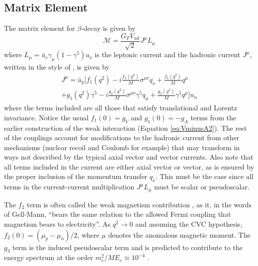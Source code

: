 \subsection{Matrix Element}
The matrix element for $\beta$-decay is given by
%
\begin{equation}
  \mathcal{M} = \frac{G_FV_{ud}}{\sqrt{2}} J^\mu L_\mu
  \label{eq:M}
\end{equation}
%
where $L_\mu = \bar{u}_e \gamma_\mu (1-\gamma^5) u_{\bar{\nu}}$ is the leptonic current
and the hadronic current $J^\mu$, written in the style of \cite{gardner2001}, is given by
%
\begin{multline}
  J^\mu = \bar{u}_p \bigg[ f_1(q^2) - i \frac{f_{2}(q^2)}{M}\sigma^{\mu\nu}q_\nu + \frac{f_3(q^2)}{M}q^\mu \\
    + g_1(q^2)\gamma^5 - i \frac{g_{2}(q^2)}{M}\sigma^{\mu\nu}\gamma^5q_\mu 
    +  \frac{g_3(q^2)}{M}\gamma^5q^\mu \bigg] u_n
  \label{eq:hadronicCurrent}
\end{multline}
%
where the terms included are all those that satisfy translational and Lorentz invariance. Notice the
usual $f_1(0)=g_V$ and $g_1(0) = -g_A$ terms from the earlier construction of the weak interaction
(Equation \ref{eq:VminusA2}). The
rest of the couplings
account for modifications to the hadronic current from other mechanisms (nuclear recoil and Coulomb for example)
that may transform in ways not described by the typical axial vector and vector currents. Also note that all terms
included in the current are either axial vector or vector, as is ensured by the proper inclusion of the momentum
transfer $q_\nu$. This must be the case since all terms in the current-current multiplication $J^\mu L_\mu$ must be
scalar or pseudoscalar.

The $f_2$ term is often called the weak magnetism contribution \cite{gellmann1958}, as it, in
the words of Gell-Mann,
``bears the same relation to the allowed Fermi coupling that magnetism bears to electricity''.
As $q^2\rightarrow0$ and assuming the CVC hypothesis,
$f_2(0) = (\mu_p - \mu_n)/2$, where $\mu$ denotes the anomalous magnetic moment.
The $g_3$ term is the induced pseudoscalar term and is predicted to contribute
to the energy spectrum at the order $m_e^2/ME_e \approx 10^{-4}$
\cite{holstein1974recoil,plaster2012}.

